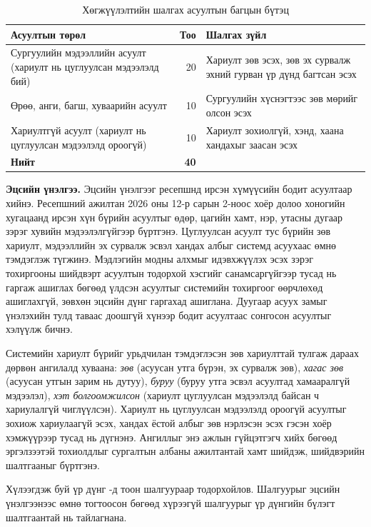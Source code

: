 \begin{table}[htbp]
\centering
\caption{Хөгжүүлэлтийн шалгах асуултын багцын бүтэц}
\label{tab:eval_set}
\begin{tabular}{|p{5.6cm}|r|p{6.4cm}|}
\hline
\textbf{Асуултын төрөл} & \textbf{Тоо} & \textbf{Шалгах зүйл} \\
\hline
Сургуулийн мэдээллийн асуулт (хариулт нь цуглуулсан мэдээлэлд бий) & 20 & Хариулт зөв эсэх, зөв эх сурвалж эхний гурван үр дүнд багтсан эсэх \\
\hline
Өрөө, анги, багш, хуваарийн асуулт & 10 & Сургуулийн хүснэгтээс зөв мөрийг олсон эсэх \\
\hline
Хариултгүй асуулт (хариулт нь цуглуулсан мэдээлэлд ороогүй) & 10 & Хариулт зохиолгүй, хэнд, хаана хандахыг заасан эсэх \\
\hline
\textbf{Нийт} & \textbf{40} & \\
\hline
\end{tabular}
\end{table}

\textbf{Эцсийн үнэлгээ.} Эцсийн үнэлгээг ресепшнд ирсэн хүмүүсийн бодит асуултаар хийнэ. Ресепшний ажилтан 2026 оны 12-р сарын 2-ноос хоёр долоо хоногийн хугацаанд ирсэн хүн бүрийн асуултыг өдөр, цагийн хамт, нэр, утасны дугаар зэрэг хувийн мэдээлэлгүйгээр бүртгэнэ. Цуглуулсан асуулт тус бүрийн зөв хариулт, мэдээллийн эх сурвалж эсвэл хандах албыг системд асуухаас өмнө тэмдэглэж түгжинэ. Мэдлэгийн модны алхмыг идэвхжүүлэх эсэх зэрэг тохиргооны шийдвэрт асуултын тодорхой хэсгийг санамсаргүйгээр тусад нь гаргаж ашиглах бөгөөд үлдсэн асуултыг системийн тохиргоог өөрчлөхөд ашиглахгүй, зөвхөн эцсийн дүнг гаргахад ашиглана. Дуугаар асуух замыг үнэлэхийн тулд таваас доошгүй хүнээр бодит асуултаас сонгосон асуултыг хэлүүлж бичнэ.

Системийн хариулт бүрийг урьдчилан тэмдэглэсэн зөв хариулттай тулгаж дараах дөрвөн ангилалд хуваана: \textit{зөв} (асуусан утга бүрэн, эх сурвалж зөв), \textit{хагас зөв} (асуусан утгын зарим нь дутуу), \textit{буруу} (буруу утга эсвэл асуултад хамааралгүй мэдээлэл), \textit{хэт болгоомжилсон} (хариулт цуглуулсан мэдээлэлд байсан ч хариулалгүй чиглүүлсэн). Хариулт нь цуглуулсан мэдээлэлд ороогүй асуултыг зохиож хариулаагүй эсэх, хандах ёстой албыг зөв нэрлэсэн эсэх гэсэн хоёр хэмжүүрээр тусад нь дүгнэнэ. Ангиллыг энэ ажлын гүйцэтгэгч хийх бөгөөд эргэлзээтэй тохиолдлыг сургалтын албаны ажилтантай хамт шийдэж, шийдвэрийн шалтгааныг бүртгэнэ.

Хүлээгдэж буй үр дүнг -д тоон шалгуураар тодорхойлов. Шалгуурыг эцсийн үнэлгээнээс өмнө тогтоосон бөгөөд хүрээгүй шалгуурыг үр дүнгийн бүлэгт шалтгаантай нь тайлагнана.

